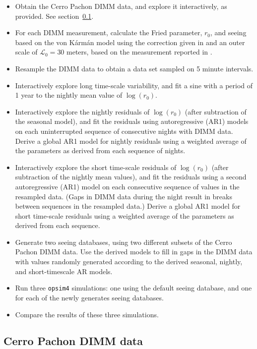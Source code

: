 \documentclass[\docopts]{\docclass}
\begin{document}
\begin{itemize}

  \item Obtain the Cerro Pachon DIMM data, and explore it
    interactively, as provided. See section~\ref{sec:dimm}.
  \item For each DIMM measurement, calculate the Fried parameter,
    $r_{0}$, and seeing based on the von K\'arm\'an model using the
    correction given in \cite{2002PASP..114.1156T} and an outer scale
    of $\mathcal{L}_{0} = 30$ meters, based on the measurement
    reported in \cite{2000ApOpt..39.5415Z}.
  \item Resample the DIMM data to obtain a data set sampled on 5
    minute intervals.
  \item Interactively explore long time-scale variability, and fit
    a sine with a period of 1 year to the nightly mean value of
    $\log(r_{0})$.
  \item Interactively explore the nightly residuals of $\log(r_{0})$
    (after subtraction of the seasonal model), and fit the residuals
    using autoregressive (AR1) models on each uninterrupted sequence
    of consecutive nights with DIMM data. Derive a global AR1 model
    for nightly residuals using a weighted average of the parameters
    as derived from each sequence of nights.
  \item Interactively explore the short time-scale residuals of
    $\log(r_{0})$ (after subtraction of the nightly mean values), and fit the
    residuals using a second autoregressive (AR1) model on each
    consecutive sequence of values in the resampled data. (Gaps
    in DIMM data during the night result in breaks between sequences
    in the resampled data.) Derive a global AR1 model for short
    time-scale residuals using a weighted average of the parameters as
    derived from each sequence.
  \item Generate two seeing databases, using two different subsets of
    the Cerro Pachon DIMM data. Use the derived models to fill in gaps
    in the DIMM data with values randomly generated according to the
    derived seasonal, nightly, and short-timescale AR models.
  \item Run three \texttt{opsim4} simulations: one using the default seeing
    database, and one for each of the newly generates seeing
    databases.
  \item Compare the results of these three simulations.
\end{itemize}

\subsection{Cerro Pachon DIMM data}
\label{sec:dimm}
\end{document}
